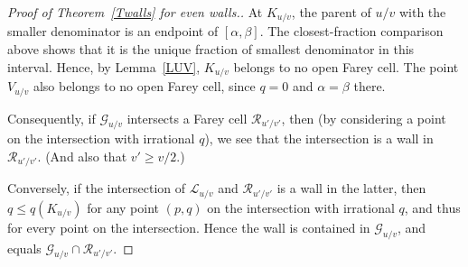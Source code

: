 \documentclass[11pt,reqno,tbtags,a4paper]{amsart}
\numberwithin{equation}{section}
\renewcommand\le{\leq}
\renewcommand\ge{\geq}
\renewcommand\leq{\leqslant}
\renewcommand\geq{\geqslant}
\theoremstyle{plain}%
\theoremstyle{definition}
\theoremstyle{remark}
\newcommand{\refT}[1]{Theorem~\ref{#1}}
\newcommand{\refL}[1]{Lemma~\ref{#1}}
\newcommand\ga{\alpha}
\newcommand\gb{\beta}
\newcommand\LL{{\mathcal L}}
\newcommand\LG{{\mathcal G}} %
\newcommand\cR{{\mathcal R}}
\newcommand\uv{_{u/v}}
\newcommand\uvi{_{u'/v'}}
\newcommand\0{{\boldsymbol 0}}
\newcommand\1{{\boldsymbol 1}}
\begin{document}
\begin{proof}[Proof of \refT{Twalls} for even walls.]
At $K\uv$, the parent of $u/v$ with the smaller denominator is an endpoint of
$[\ga,\gb]$. The closest-fraction comparison above shows that it is the
unique fraction of smallest denominator in this interval.
Hence, by \refL{LUV}, 
$K\uv$ belongs to no open Farey cell.
%
The point $V\uv$ also belongs to no open Farey cell, 
since $q=0$ and $\ga=\gb$ there.

Consequently, if
$\LG\uv$ intersects a Farey cell $\cR\uvi$, then (by considering a point on
the intersection with irrational $q$), we see that the intersection is a
wall in $\cR\uvi$. (And also that $v'\ge v/2$.) 

Conversely, if 
the intersection of $\LL\uv$ and $\cR\uvi$ is a wall
in the latter, then $q\le q(K\uv)$ for any point $(p,q)$ on the intersection
with irrational $q$, and thus for every point on the intersection.
Hence the wall is contained in $\LG\uv$, and equals $\LG\uv\cap\cR\uvi$.
\end{proof}
\end{document}
